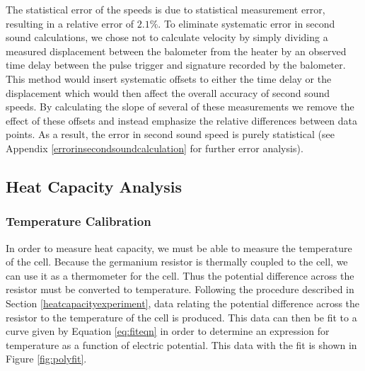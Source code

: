 The statistical error of the speeds is due to statistical measurement error, resulting in a relative error of $2.1\%$. To eliminate systematic error in second sound calculations, we chose not to calculate velocity by simply dividing a measured displacement between the balometer from the heater by an observed time delay between the pulse trigger and signature recorded by the balometer. This method would insert systematic offsets to either the time delay or the displacement which would then affect the overall accuracy of second sound speeds.  By calculating the slope of several of these measurements we remove the effect of these offsets and instead emphasize the relative differences between data points.  As a result, the error in second sound speed is purely statistical (see Appendix \ref{errorinsecondsoundcalculation} for further error analysis).

\subsection{Heat Capacity Analysis}\label{heatcapacityanalysis}
\subsubsection{Temperature Calibration}\label{temperaturecalibration}

In order to measure heat capacity, we must be able to measure the temperature of the cell.  Because the germanium resistor is thermally coupled to the cell, we can use it as a thermometer for the cell.  Thus the potential difference across the resistor must be converted to temperature.  Following the procedure described in Section \ref{heatcapacityexperiment}, data relating the potential difference across the resistor to the temperature of the cell is produced.  This data can then be fit to a curve given by Equation \ref{eq:fiteqn} in order to determine an expression for temperature as a function of electric potential.  This data with the fit is shown in Figure \ref{fig:polyfit}.  

